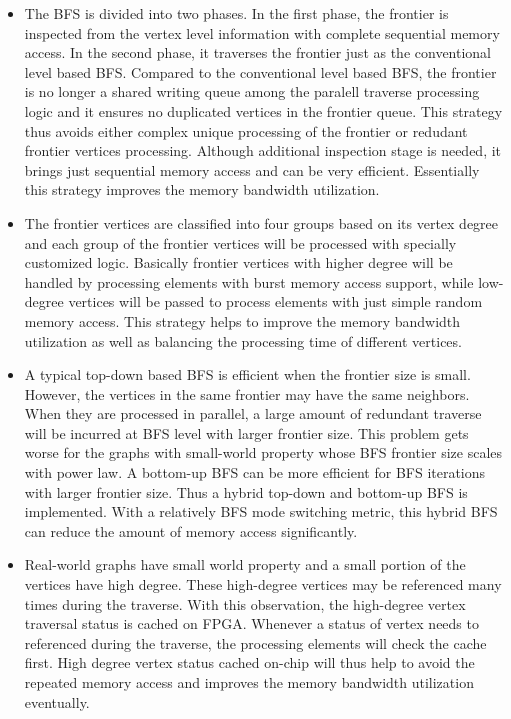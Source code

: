 \documentclass[12pt]{article} %
\begin{document}
\begin{itemize}
	\item The BFS is divided into two phases. In the first phase, the frontier is 
		inspected from the vertex level information with complete sequential 
		memory access. In the second phase, it traverses the frontier just as the 
		conventional level based BFS. Compared to the conventional level based BFS, 
		the frontier is no longer a shared writing queue among the paralell traverse 
		processing logic and it ensures no duplicated vertices in the frontier queue. This 
		strategy thus avoids either complex unique processing of the frontier or 
		redudant frontier vertices processing. Although additional inspection stage is 
		needed, it brings just sequential memory access and can be very efficient.
		Essentially this strategy improves the memory bandwidth utilization.

	\item The frontier vertices are classified into four groups based on 
		its vertex degree and each group of the frontier vertices will be 
		processed with specially customized logic. Basically frontier 
		vertices with higher degree will be handled by processing elements 
		with burst memory access support, while low-degree vertices will be 
		passed to process elements with just simple random memory access. 
		This strategy helps to improve the memory bandwidth utilization as 
		well as balancing the processing time of different vertices.

	\item A typical top-down based BFS is efficient when the frontier size is small. However, 
		the vertices in the same frontier may have the same neighbors. When they are 
		processed in parallel, a large amount of redundant traverse will be incurred at BFS 
		level with larger frontier size. This problem gets worse for the graphs with 
		small-world property whose BFS frontier size scales with power law. A bottom-up BFS 
		can be more efficient for BFS iterations with larger frontier size. Thus a hybrid top-down 
		and bottom-up BFS is implemented. With a relatively BFS mode switching metric, this hybrid 
		BFS can reduce the amount of memory access significantly.  
		
	\item Real-world graphs have small world property and a small portion of the vertices have high 
		degree. These high-degree vertices may be referenced many times during the traverse. With this 
		observation, the high-degree vertex traversal status is cached on FPGA. Whenever a status of 
		vertex needs to referenced during the traverse, the processing elements will check the 
		cache first. High degree vertex status cached on-chip will thus help to avoid the repeated 
		memory access and improves the memory bandwidth utilization eventually. 
\end{itemize}
\end{document}
